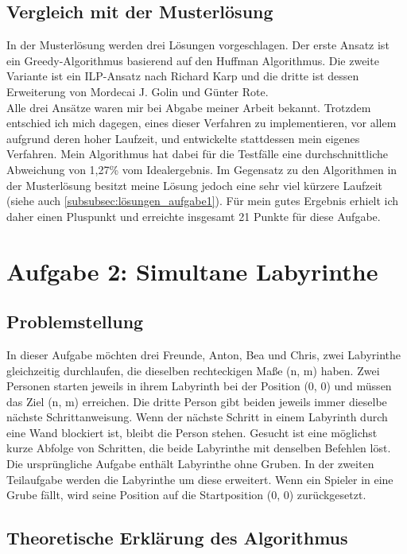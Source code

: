 \documentclass[a4paper,12pt,ngerman]{scrartcl}
\begin{document}
\subsection{Vergleich mit der Musterlösung}
In der Musterlösung werden drei Lösungen vorgeschlagen.
Der erste Ansatz ist ein Greedy-Algorithmus basierend auf den Huffman Algorithmus.
Die zweite Variante ist ein ILP-Ansatz nach Richard Karp und
die dritte ist dessen Erweiterung von Mordecai J. Golin und Günter Rote.\cite{bwinf_loesung}\\
Alle drei Ansätze waren mir bei Abgabe meiner Arbeit bekannt. 
Trotzdem entschied ich mich dagegen, eines dieser Verfahren zu implementieren, vor allem aufgrund deren hoher Laufzeit, 
und entwickelte stattdessen mein eigenes Verfahren.
Mein Algorithmus hat dabei für die Testfälle eine durchschnittliche Abweichung von 1,27\% vom Idealergebnis.
Im Gegensatz zu den Algorithmen in der Musterlösung besitzt meine Lösung jedoch eine sehr viel kürzere Laufzeit \cite{bwinf_loesung} (siehe auch \ref{subsubsec:lösungen_aufgabe1}).
Für mein gutes Ergebnis erhielt ich daher einen Pluspunkt und erreichte insgesamt 21 Punkte für diese Aufgabe.

\clearpage
\section{Aufgabe 2: Simultane Labyrinthe}
\subsection{Problemstellung}
In dieser Aufgabe möchten drei Freunde, Anton, Bea und Chris, zwei Labyrinthe gleichzeitig durchlaufen, die
dieselben rechteckigen Maße (n, m) haben.
Zwei Personen starten jeweils in ihrem Labyrinth bei der Position (0, 0) und müssen das Ziel (n, m) erreichen.
Die dritte Person gibt beiden jeweils immer dieselbe nächste Schrittanweisung. 
Wenn der nächste Schritt in einem Labyrinth durch eine Wand blockiert ist, bleibt die Person stehen.
Gesucht ist eine möglichst kurze Abfolge von Schritten, die beide Labyrinthe mit denselben Befehlen löst.
Die ursprüngliche Aufgabe enthält Labyrinthe ohne Gruben. In der zweiten Teilaufgabe werden die Labyrinthe um diese erweitert.
Wenn ein Spieler in eine Grube fällt, wird seine Position auf die Startposition (0, 0) zurückgesetzt.\cite{bwinf_aufgabe}

\subsection{Theoretische Erklärung des Algorithmus}
\end{document}
